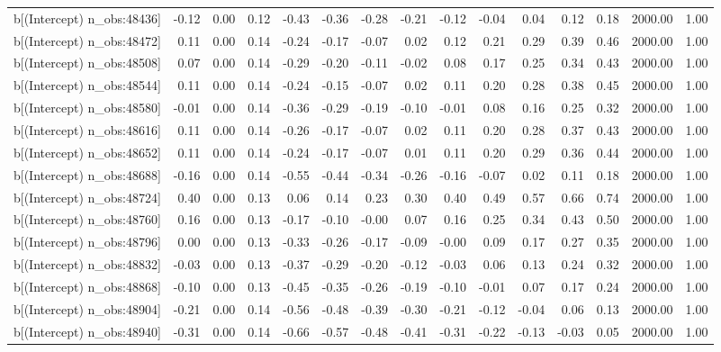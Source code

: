 \begin{table}[ht]
\begin{tabular}{rrrrrrrrrrrrrrr}
  b[(Intercept) n\_obs:48436] & -0.12 & 0.00 & 0.12 & -0.43 & -0.36 & -0.28 & -0.21 & -0.12 & -0.04 & 0.04 & 0.12 & 0.18 & 2000.00 & 1.00 \\ 
  b[(Intercept) n\_obs:48472] & 0.11 & 0.00 & 0.14 & -0.24 & -0.17 & -0.07 & 0.02 & 0.12 & 0.21 & 0.29 & 0.39 & 0.46 & 2000.00 & 1.00 \\ 
  b[(Intercept) n\_obs:48508] & 0.07 & 0.00 & 0.14 & -0.29 & -0.20 & -0.11 & -0.02 & 0.08 & 0.17 & 0.25 & 0.34 & 0.43 & 2000.00 & 1.00 \\ 
  b[(Intercept) n\_obs:48544] & 0.11 & 0.00 & 0.14 & -0.24 & -0.15 & -0.07 & 0.02 & 0.11 & 0.20 & 0.28 & 0.38 & 0.45 & 2000.00 & 1.00 \\ 
  b[(Intercept) n\_obs:48580] & -0.01 & 0.00 & 0.14 & -0.36 & -0.29 & -0.19 & -0.10 & -0.01 & 0.08 & 0.16 & 0.25 & 0.32 & 2000.00 & 1.00 \\ 
  b[(Intercept) n\_obs:48616] & 0.11 & 0.00 & 0.14 & -0.26 & -0.17 & -0.07 & 0.02 & 0.11 & 0.20 & 0.28 & 0.37 & 0.43 & 2000.00 & 1.00 \\ 
  b[(Intercept) n\_obs:48652] & 0.11 & 0.00 & 0.14 & -0.24 & -0.17 & -0.07 & 0.01 & 0.11 & 0.20 & 0.29 & 0.36 & 0.44 & 2000.00 & 1.00 \\ 
  b[(Intercept) n\_obs:48688] & -0.16 & 0.00 & 0.14 & -0.55 & -0.44 & -0.34 & -0.26 & -0.16 & -0.07 & 0.02 & 0.11 & 0.18 & 2000.00 & 1.00 \\ 
  b[(Intercept) n\_obs:48724] & 0.40 & 0.00 & 0.13 & 0.06 & 0.14 & 0.23 & 0.30 & 0.40 & 0.49 & 0.57 & 0.66 & 0.74 & 2000.00 & 1.00 \\ 
  b[(Intercept) n\_obs:48760] & 0.16 & 0.00 & 0.13 & -0.17 & -0.10 & -0.00 & 0.07 & 0.16 & 0.25 & 0.34 & 0.43 & 0.50 & 2000.00 & 1.00 \\ 
  b[(Intercept) n\_obs:48796] & 0.00 & 0.00 & 0.13 & -0.33 & -0.26 & -0.17 & -0.09 & -0.00 & 0.09 & 0.17 & 0.27 & 0.35 & 2000.00 & 1.00 \\ 
  b[(Intercept) n\_obs:48832] & -0.03 & 0.00 & 0.13 & -0.37 & -0.29 & -0.20 & -0.12 & -0.03 & 0.06 & 0.13 & 0.24 & 0.32 & 2000.00 & 1.00 \\ 
  b[(Intercept) n\_obs:48868] & -0.10 & 0.00 & 0.13 & -0.45 & -0.35 & -0.26 & -0.19 & -0.10 & -0.01 & 0.07 & 0.17 & 0.24 & 2000.00 & 1.00 \\ 
  b[(Intercept) n\_obs:48904] & -0.21 & 0.00 & 0.14 & -0.56 & -0.48 & -0.39 & -0.30 & -0.21 & -0.12 & -0.04 & 0.06 & 0.13 & 2000.00 & 1.00 \\ 
  b[(Intercept) n\_obs:48940] & -0.31 & 0.00 & 0.14 & -0.66 & -0.57 & -0.48 & -0.41 & -0.31 & -0.22 & -0.13 & -0.03 & 0.05 & 2000.00 & 1.00 \\ 

\end{tabular}
\end{table}
